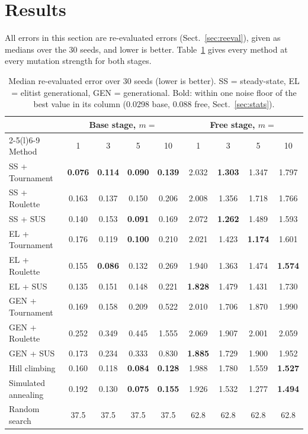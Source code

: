 \section{Results}
\label{sec:results}

All errors in this section are re-evaluated errors (Sect.~\ref{sec:reeval}), given as medians over the 30 seeds, and lower is better. Table~\ref{tab:main} gives every method at every mutation strength for both stages.

\begin{table}[!htb]
\centering
\caption{Median re-evaluated error over 30 seeds (lower is better). SS = steady-state, EL = elitist generational, GEN = generational. Bold: within one noise floor of the best value in its column (0.0298 base, 0.088 free, Sect.~\ref{sec:stats}).}
\label{tab:main}
\setlength{\tabcolsep}{3.5pt}
\footnotesize
\begin{tabular}{@{}lcccccccc@{}}
\toprule
 & \multicolumn{4}{c}{Base stage, $m =$} & \multicolumn{4}{c}{Free stage, $m =$} \\
\cmidrule(lr){2-5}\cmidrule(l){6-9}
Method & 1 & 3 & 5 & 10 & 1 & 3 & 5 & 10 \\
\midrule
SS + Tournament & \textbf{0.076} & \textbf{0.114} & \textbf{0.090} & \textbf{0.139} & 2.032 & \textbf{1.303} & 1.347 & 1.797 \\
SS + Roulette & 0.163 & 0.137 & 0.150 & 0.206 & 2.008 & 1.356 & 1.718 & 1.766 \\
SS + SUS & 0.140 & 0.153 & \textbf{0.091} & 0.169 & 2.072 & \textbf{1.262} & 1.489 & 1.593 \\
EL + Tournament & 0.176 & 0.119 & \textbf{0.100} & 0.210 & 2.021 & 1.423 & \textbf{1.174} & 1.601 \\
EL + Roulette & 0.155 & \textbf{0.086} & 0.132 & 0.269 & 1.940 & 1.363 & 1.474 & \textbf{1.574} \\
EL + SUS & 0.135 & 0.151 & 0.148 & 0.221 & \textbf{1.828} & 1.479 & 1.431 & 1.730 \\
GEN + Tournament & 0.169 & 0.158 & 0.209 & 0.522 & 2.010 & 1.706 & 1.870 & 1.990 \\
GEN + Roulette & 0.252 & 0.349 & 0.445 & 1.555 & 2.069 & 1.907 & 2.001 & 2.059 \\
GEN + SUS & 0.173 & 0.234 & 0.333 & 0.830 & \textbf{1.885} & 1.729 & 1.900 & 1.952 \\
\midrule
Hill climbing & 0.160 & 0.118 & \textbf{0.084} & \textbf{0.128} & 1.988 & 1.780 & 1.559 & \textbf{1.527} \\
Simulated annealing & 0.192 & 0.130 & \textbf{0.075} & \textbf{0.155} & 1.926 & 1.532 & 1.277 & \textbf{1.494} \\
Random search & 37.5 & 37.5 & 37.5 & 37.5 & 62.8 & 62.8 & 62.8 & 62.8 \\
\bottomrule
\end{tabular}
\end{table}

